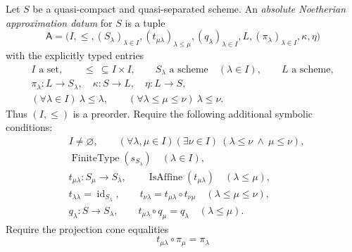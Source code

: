\begin{definition}
  \label{def:nagata-absolute-noetherian-approximation-datum}

  Let \(S\) be a quasi-compact and quasi-separated scheme.  An
  \emph{absolute Noetherian approximation datum} for \(S\) is a tuple
  \[
    \mathsf A=
    \bigl(I,\leq,(S_\lambda)_{\lambda\in I},
      (t_{\mu\lambda})_{\lambda\leq\mu},
      (q_\lambda)_{\lambda\in I},
      L,(\pi_\lambda)_{\lambda\in I},\kappa,\eta\bigr)              \tag{68}
  \]
  with the explicitly typed entries
  \[
  \begin{gathered}
    I\text{ a set},\qquad {\leq}\ \subseteq I\times I,\qquad
    S_\lambda\text{ a scheme}\quad(\lambda\in I),\qquad
    L\text{ a scheme},\\
    \pi_\lambda\colon L\to S_\lambda,\quad
    \kappa\colon S\to L,\quad \eta\colon L\to S,\\
    (\forall\lambda\in I)\ \lambda\leq\lambda,\qquad
    (\forall\lambda\leq\mu\leq\nu)\ \lambda\leq\nu .
  \end{gathered}                                                     \tag{68a}
  \]
  Thus \((I,\leq)\) is a preorder.  Require the following additional
  symbolic conditions:
  \begin{align}
    &I\neq\varnothing,\qquad
    (\forall\lambda,\mu\in I)(\exists\nu\in I)\ 
      (\lambda\leq\nu\ \wedge\ \mu\leq\nu),                         \tag{69}\\
    &\operatorname{FiniteType}(s_{S_\lambda})
      \quad(\lambda\in I),                                          \tag{70}\\
    &t_{\mu\lambda}\colon S_\mu\to S_\lambda,\qquad
      \operatorname{IsAffine}(t_{\mu\lambda})
      \quad(\lambda\leq\mu),                                        \tag{71}\\
    &t_{\lambda\lambda}=\operatorname{id}_{S_\lambda},\qquad
    t_{\nu\lambda}=t_{\mu\lambda}\circ t_{\nu\mu}
      \quad(\lambda\leq\mu\leq\nu),                                 \tag{72}\\
    &q_\lambda\colon S\to S_\lambda,\qquad
    t_{\mu\lambda}\circ q_\mu=q_\lambda
      \quad(\lambda\leq\mu).                                        \tag{73}
  \end{align}
  Require the projection cone equalities
  \[
    t_{\mu\lambda}\circ\pi_\mu=\pi_\lambda
\]
\end{definition}
